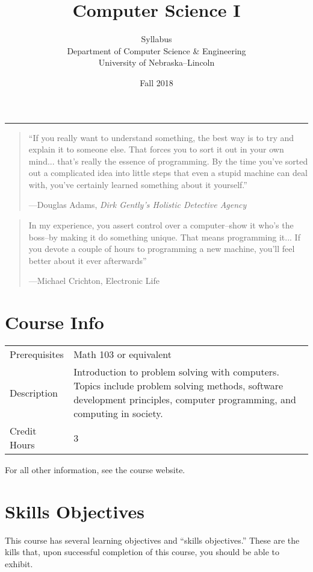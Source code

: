 \documentclass[12pt]{scrartcl}
\title{Computer Science I}\let\Title\@title
\subtitle{Syllabus\\
{\small
\vskip1cm
Department of Computer Science \& Engineering \\
University of Nebraska--Lincoln}
\vskip-1cm}
\date{Fall 2018}
\begin{document}
\maketitle

\hrule

\begin{quote}
``If you really want to understand something, the best way is to try and explain it to someone else. That forces you to sort it out in your own mind... that's really the essence of programming. By the time you've sorted out a complicated idea into little steps that even a stupid machine can deal with, you've certainly learned something about it yourself.'' 

\hfill ---Douglas Adams, \emph{Dirk Gently's Holistic Detective Agency}
\end{quote}

\begin{quote}
In my experience, you assert control over a computer--show it who's the boss--by making it do something unique. That means programming it... If you devote a couple of hours to programming a new machine, you'll feel better about it ever afterwards'' 

\hfill ---Michael Crichton, Electronic Life
\end{quote}

\section{Course Info}

\begin{tabular}{lp{10cm}}
Prerequisites & Math 103 or equivalent \\
Description  & Introduction to problem solving with computers. 
Topics include problem solving methods, software development 
principles, computer programming, and computing in society.\\
Credit Hours & 3\\
\end{tabular}

For all other information, see the course website.

\section{Skills Objectives}

This course has several learning objectives and ``skills objectives.''
These are the kills that, upon successful completion of this course, 
you should be able to exhibit.
\end{document}
